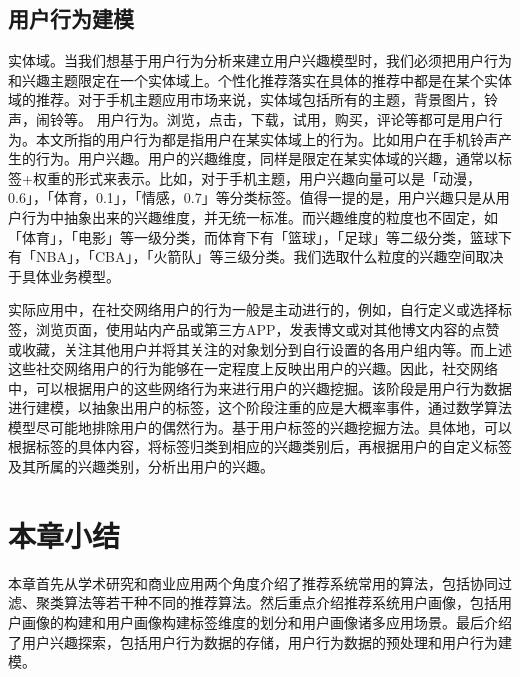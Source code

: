 		\subsection{用户行为建模}

		实体域。当我们想基于用户行为分析来建立用户兴趣模型时，我们必须把用户行为和兴趣主题限定在一个实体域上。个性化推荐落实在具体的推荐中都是在某个实体域的推荐。对于手机主题应用市场来说，实体域包括所有的主题，背景图片，铃声，闹铃等。  用户行为。浏览，点击，下载，试用，购买，评论等都可是用户行为。本文所指的用户行为都是指用户在某实体域上的行为。比如用户在手机铃声产生的行为。用户兴趣。用户的兴趣维度，同样是限定在某实体域的兴趣，通常以标签+权重的形式来表示。比如，对于手机主题，用户兴趣向量可以是「动漫，0.6」，「体育，0.1」，「情感，0.7」等分类标签。值得一提的是，用户兴趣只是从用户行为中抽象出来的兴趣维度，并无统一标准。而兴趣维度的粒度也不固定，如「体育」，「电影」等一级分类，而体育下有「篮球」，「足球」等二级分类，篮球下有「NBA」，「CBA」，「火箭队」等三级分类。我们选取什么粒度的兴趣空间取决于具体业务模型。
		
		实际应用中，在社交网络用户的行为一般是主动进行的，例如，自行定义或选择标签，浏览页面，使用站内产品或第三方APP，发表博文或对其他博文内容的点赞或收藏，关注其他用户并将其关注的对象划分到自行设置的各用户组内等。而上述这些社交网络用户的行为能够在一定程度上反映出用户的兴趣。因此，社交网络中，可以根据用户的这些网络行为来进行用户的兴趣挖掘。该阶段是用户行为数据进行建模，以抽象出用户的标签，这个阶段注重的应是大概率事件，通过数学算法模型尽可能地排除用户的偶然行为。基于用户标签的兴趣挖掘方法。具体地，可以根据标签的具体内容，将标签归类到相应的兴趣类别后，再根据用户的自定义标签及其所属的兴趣类别，分析出用户的兴趣。

	\section{本章小结}
	本章首先从学术研究和商业应用两个角度介绍了推荐系统常用的算法，包括协同过滤、聚类算法等若干种不同的推荐算法。然后重点介绍推荐系统用户画像，包括用户画像的构建和用户画像构建标签维度的划分和用户画像诸多应用场景。最后介绍了用户兴趣探索，包括用户行为数据的存储，用户行为数据的预处理和用户行为建模。